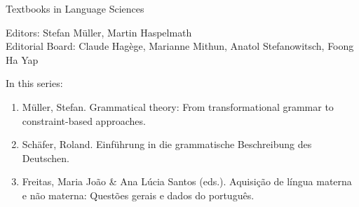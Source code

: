 {\large Textbooks in Language Sciences}

\bigskip

Editors: Stefan Müller, Martin Haspelmath  \\
Editorial Board: Claude Hagège, Marianne Mithun, Anatol Stefanowitsch, Foong Ha Yap

\bigskip

In this series:

\begin{enumerate}
\item Müller, Stefan. Grammatical theory: From transformational grammar to constraint-based approaches.
\item Schäfer, Roland. Einführung in die grammatische Beschreibung des Deutschen.
\item Freitas, Maria João \& Ana Lúcia Santos (eds.). Aquisição de língua materna e não materna: Questões gerais e dados do português.
\end{enumerate}



